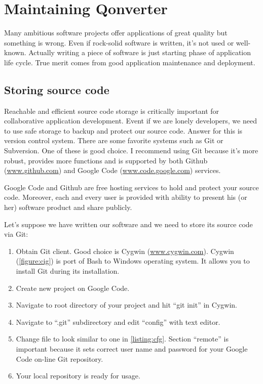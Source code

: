 \chapter{Maintaining Qonverter}
Many ambitious software projects offer applications of great quality but something is wrong. Even if rock-solid software is written, it's not used or well-known. Actually writing a piece of software is just starting phase of application life cycle. True merit comes from good application maintenance and deployment.

\section{Storing source code}
Reachable and efficient source code storage is critically important for collaborative application development. Event if we are lonely developers, we need to use safe storage to backup and protect our source code. Answer for this is version control system. There are some favorite systems such as Git or Subversion. One of these is good choice. I recommend using Git because it's more robust, provides more functions and is supported by both Github (\href{http://www.github.com}{www.github.com}) and Google Code (\href{http://www.code.google.com}{www.code.google.com}) services.

Google Code and Github are free hosting services to hold and protect your source code. Moreover, each and every user is provided with ability to present his (or her) software product and share publicly.

Let's suppose we have written our software and we need to store its source code via Git:
\begin{enumerate}
\item Obtain Git client. Good choice is Cygwin (\href{http://www.cygwin.com}{www.cygwin.com}). Cygwin (\autoref{figure:cig}) is port of Bash to Windows operating system. It allows you to install Git during its installation.
\item Create new project on Google Code.
\item Navigate to root directory of your project and hit \enquote{git init} in Cygwin.
\item Navigate to \enquote{.git} subdirectory and edit \enquote{config} with text editor.
\item Change file to look similar to one in \autoref{listing:cfg}. Section \enquote{remote} is important because it sets correct user name and password for your Google Code on-line Git repository.
\item Your local repository is ready for usage.
\end{enumerate}

